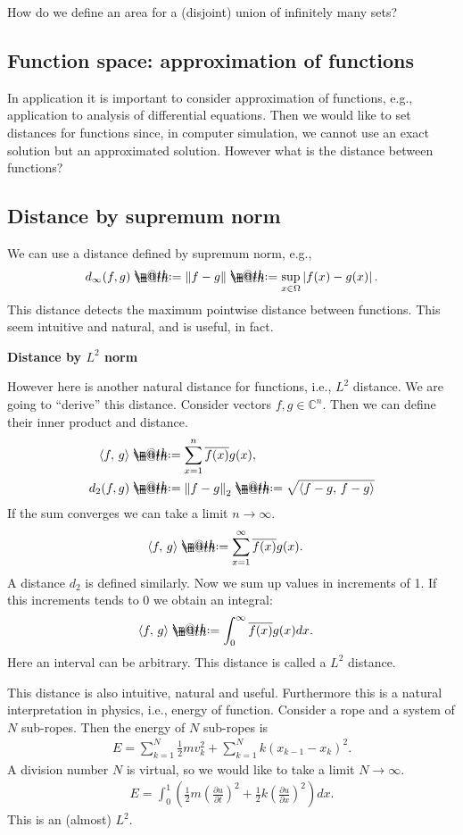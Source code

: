 \documentclass[openany, a4paper, oneside]{jsbook}
\makeatletter
\newcommand*{\defeq}{\mathrel{\rlap{%
\raisebox{0.3ex}{$\m@th\cdot$}}%
\raisebox{-0.3ex}{$\m@th\cdot$}}%
=}
\theoremstyle{break}
\theoremstyle{breakdefn}
\newcommand{\abs}[1]{\left|#1\right|}
\newcommand{\norm}[1]{\left\Vert#1\right\Vert}
\newcommand{\rbk}[1]{\left (#1\right)}
\newcommand{\bkt}[2]{\left\langle#1,\,#2\right\rangle}
\newcommand{\bbC}{\mathbb{C}}
\makeatother
\begin{document}
How do we define an area for a (disjoint) union of infinitely many sets?
\subsection{Function space: approximation of functions}


In application it is important to consider approximation of functions,
e.g., application to analysis of differential equations.
Then we would like to set distances for functions since,
in computer simulation, we cannot use an exact solution but an approximated solution.
However what is the distance between functions?
\subsection{Distance by supremum norm}


We can use a distance defined by supremum norm, e.g.,
\begin{align}
 d_{\infty}(f, g)
 \defeq
 \norm{f - g}
 \defeq
 \sup_{x \in \Omega} \abs{f (x) - g (x)}.
\end{align}
This distance detects the maximum pointwise distance between functions.
This seem intuitive and natural, and is useful, in fact.

\vspace{1em}
\textbf{Distance by $L^2$ norm}

However here is another natural distance for functions, i.e., $L^2$ distance.
We are going to ``derive'' this distance.
Consider vectors $f, g \in \bbC^n$.
Then we can define their inner product and distance.
\begin{align}
 \bkt{f}{g}
 &\defeq
 \sum_{x=1}^{n} \overline{f (x)} g (x), \\
 d_2 (f, g)
 &\defeq
 \norm{f - g}_2
 \defeq
 \sqrt{\bkt{f-g}{f-g}}
\end{align}
If the sum converges we can take a limit $n \to \infty$.
\begin{align}
 \bkt{f}{g}
 &\defeq
 \sum_{x=1}^{\infty} \overline{f (x)} g (x).
\end{align}
A distance $d_2$ is defined similarly.
Now we sum up values in increments of 1.
If this increments tends to 0 we obtain an integral:
\begin{align}
 \bkt{f}{g}
 &\defeq
 \int_0^{\infty} \overline{f (x)} g (x) dx.
\end{align}
Here an interval can be arbitrary.
This distance is called a $L^2$ distance.

This distance is also intuitive, natural and useful.
Furthermore this is a natural interpretation in physics, i.e., energy of function.
Consider a rope and a system of $N$ sub-ropes.
Then the energy of $N$ sub-ropes is
\begin{align}
 E
 =
 \sum_{k=1}^{N} \frac{1}{2} m v_k^2 + \sum_{k=1}^{N} k (x_{k-1} - x_{k})^2.
\end{align}
A division number $N$ is virtual, so we would like to take a limit $N \to \infty$.
\begin{align}
 E
 =
 \int_0^1 \rbk{\frac{1}{2} m \rbk{\frac{\partial u}{\partial t}}^2 + \frac{1}{2} k \rbk{\frac{\partial u}{\partial x}}^2} dx.
\end{align}
This is an (almost) $L^2$.
\end{document}
